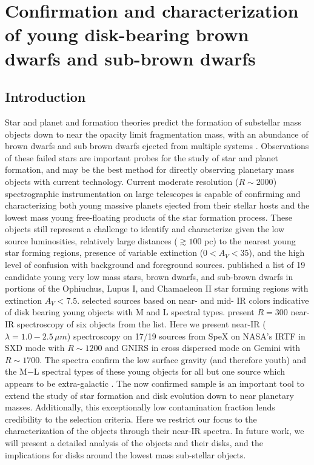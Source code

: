\chapter{Confirmation and characterization of young disk-bearing brown dwarfs and sub-brown dwarfs}
\label{ch_CS16}

\section{Introduction}
Star and planet and formation theories predict the formation of substellar mass objects down to near the opacity limit fragmentation mass, with an abundance of brown dwarfs and sub brown dwarfs ejected from multiple systems \citep{bate02,bate09}.  Observations of these failed stars are important probes for the study of star and planet formation, and may be the best method for directly observing planetary mass objects with current technology.  Current moderate resolution ($R\sim2000$) spectrographic instrumentation on large telescopes is capable of confirming and characterizing both young massive planets ejected from their stellar hosts and the lowest mass young free-floating products of the star formation process.  These objects still represent a challenge to identify and characterize given the low source luminosities, relatively large distances ($\gtrsim 100$ pc) to the nearest young star forming regions, presence of variable extinction ($0 < A_{V} < 35$), and the high level of confusion with background and foreground sources.  \citet{allers06} published a list of 19 candidate young very low mass stars, brown dwarfs, and sub-brown dwarfs in portions of the Ophiuchus, Lupus I, and Chamaeleon II star forming regions with extinction $A_{V} < 7.5$.  \citeauthor{allers06} selected sources based on near- and mid- IR colors indicative of disk bearing young objects with M and L spectral types.  \citet{allers07} present $R=300$ near-IR spectroscopy of six objects from the \citet{allers06} list.  Here we present near-IR ($\lambda=1.0-2.5 \,\mu m$) spectroscopy on 17/19 sources from SpeX on NASA's IRTF \citep{rayner03, cushing04, vacca03} in SXD mode with $R\sim1200$ and GNIRS \citep{elias1998,elias06} in cross dispersed mode on Gemini with $R\sim1700$.  The spectra confirm the low surface gravity (and therefore youth) and the M$-$L spectral types of these young objects for all but one source which appears to be extra-galactic \citep{rayjay06}.  The now confirmed sample is an important tool to extend the study of star formation and disk evolution down to near planetary masses.  Additionally, this exceptionally low contamination fraction lends credibility to the selection criteria.  Here we restrict our focus to the characterization of the objects through their near-IR spectra.  In future work, we will present a detailed analysis of the objects and their disks, and the implications for disks around the lowest mass sub-stellar objects.

